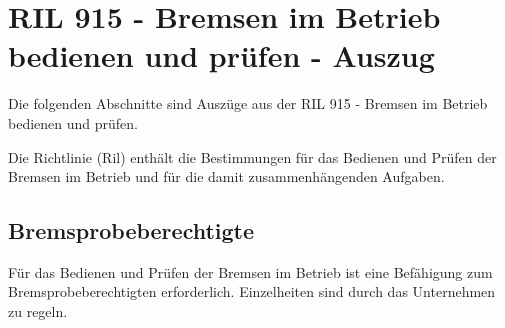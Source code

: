 \section{RIL 915 - Bremsen im Betrieb bedienen und prüfen - Auszug}
Die folgenden Abschnitte sind Auszüge aus der RIL 915 - Bremsen im Betrieb bedienen und prüfen.\cite{RIL915}\par
Die Richtlinie (Ril) enthält die Bestimmungen für das Bedienen und Prüfen der Bremsen im Betrieb und für die damit zusammenhängenden Aufgaben.
\subsection{Bremsprobeberechtigte}
Für das Bedienen und Prüfen der Bremsen im Betrieb ist eine Befähigung zum Bremsprobeberechtigten erforderlich. Einzelheiten sind durch das Unternehmen zu regeln.
